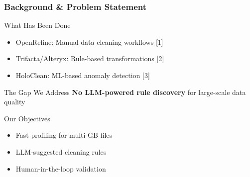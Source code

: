 \documentclass{beamer}
\begin{document}
\begin{frame}
    \frametitle{Background \& Problem Statement}
    
    \begin{block}{What Has Been Done}
        \begin{itemize}
            \item OpenRefine: Manual data cleaning workflows [1]
            \item Trifacta/Alteryx: Rule-based transformations [2]
            \item HoloClean: ML-based anomaly detection [3]
        \end{itemize}
    \end{block}
    
    \vspace{0.15cm}
    
    \begin{alertblock}{The Gap We Address}
        \textbf{No LLM-powered rule discovery} for large-scale data quality
    \end{alertblock}
    
    \vspace{0.15cm}
    
    \begin{exampleblock}{Our Objectives}
        \begin{itemize}
            \item Fast profiling for multi-GB files
            \item LLM-suggested cleaning rules
            \item Human-in-the-loop validation
        \end{itemize}
    \end{exampleblock}
\end{frame}
\end{document}
